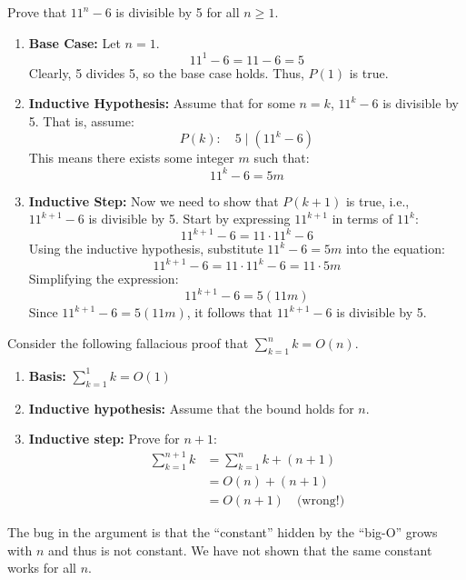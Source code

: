     \begin{example}
        Prove that \( 11^n - 6 \) is divisible by 5 for all \( n \geq 1 \).

        \begin{enumerate}
            \item \textbf{Base Case:} Let \( n = 1 \).
            \[
            11^1 - 6 = 11 - 6 = 5
            \]
            Clearly, 5 divides 5, so the base case holds. Thus, \( P(1) \) is true.

            \item \textbf{Inductive Hypothesis:} Assume that for some \( n = k \), \( 11^k - 6 \) is divisible by 5. That is, assume:
            \[
            P(k): \quad 5 \mid (11^k - 6)
            \]
            This means there exists some integer \( m \) such that:
            \[
            11^k - 6 = 5m
            \]

            \item \textbf{Inductive Step:} Now we need to show that \( P(k+1) \) is true, i.e., \( 11^{k+1} - 6 \) is divisible by 5. Start by expressing \( 11^{k+1} \) in terms of \( 11^k \):
            \[
            11^{k+1} - 6 = 11 \cdot 11^k - 6
            \]
            Using the inductive hypothesis, substitute \( 11^k - 6 = 5m \) into the equation:
            \[
            11^{k+1} - 6 = 11 \cdot 11^k - 6 = 11 \cdot 5m 
            \]
            Simplifying the expression:
            \[
            11^{k+1} - 6 = 5(11m)
            \]
            Since \( 11^{k+1} - 6 = 5(11m) \), it follows that \( 11^{k+1} - 6 \) is divisible by 5.
        \end{enumerate}
    \end{example}

    \begin{warning}
        Consider the following fallacious proof that \( \sum_{k=1}^n k = O(n) \). 
        \begin{enumerate}
            \item \textbf{Basis:} \( \sum_{k=1}^1 k = O(1) \) 
            \item \textbf{Inductive hypothesis:} Assume that the bound holds for \( n \).
            \item \textbf{Inductive step:} Prove for $n+1$:
            \begin{align*}
                \sum_{k=1}^{n+1} k &= \sum_{k=1}^{n} k + (n + 1) \\
                                    &= O(n) + (n + 1) \\
                                    &= O(n + 1) \quad \text{(wrong!)}
            \end{align*}
        \end{enumerate}

        The bug in the argument is that the “constant” hidden by the “big-O” grows with \( n \) and thus is not constant. We have not shown that the same constant works for all \( n \).
    \end{warning}

